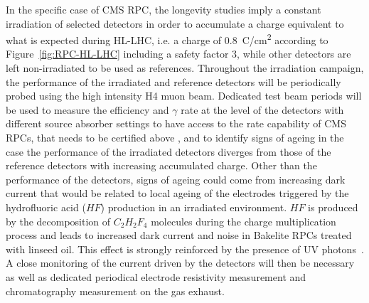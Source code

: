 	In the specific case of CMS RPC, the longevity studies imply a constant irradiation of selected detectors in order to accumulate a charge equivalent to what is expected during HL-LHC, i.e. a charge of \SI{0.8}{C/cm^2} according to Figure~\ref{fig:RPC-HL-LHC} including a safety factor 3, while other detectors are left non-irradiated to be used as references. Throughout the irradiation campaign, the performance of the irradiated and reference detectors will be periodically probed using the high intensity H4 muon beam. Dedicated test beam periods will be used to measure the efficiency and $\gamma$ rate at the level of the detectors with different source absorber settings to have access to the rate capability of CMS RPCs, that needs to be certified above , and to identify signs of ageing in the case the performance of the irradiated detectors diverges from those of the reference detectors with increasing accumulated charge. Other than the performance of the detectors, signs of ageing could come from increasing dark current that would be related to local ageing of the electrodes triggered by the hydrofluoric acid ($HF$) production in an irradiated environment. $HF$ is produced by the decomposition of $C_2H_2F_4$ molecules during the charge multiplication process and leads to increased dark current and noise in Bakelite RPCs treated with linseed oil. This effect is strongly reinforced by the presence of UV photons~\cite{GUIDA2008,BELLINI2008}. A close monitoring of the current driven by the detectors will then be necessary as well as dedicated periodical electrode resistivity measurement and chromatography measurement on the gas exhaust.
	
